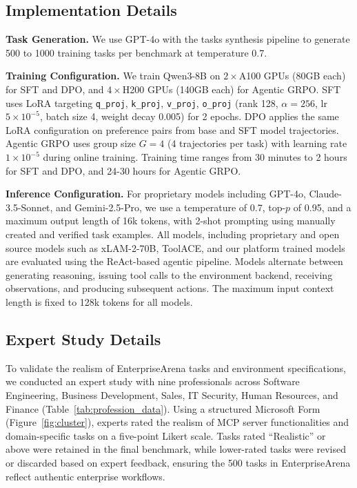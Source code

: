 \documentclass{article}
\theoremstyle{plain}
\theoremstyle{definition}
\theoremstyle{remark}
\begin{document}
\subsection{Implementation Details}
\label{app:implementation}
\vspace{-0.2cm}
\textbf{Task Generation.} We use GPT-4o with the tasks synthesis pipeline 
to generate 500 to 1000 training tasks per benchmark at temperature 0.7.

\noindent\textbf{Training Configuration.} 
We train Qwen3-8B on $2\times$A100 GPUs (80GB each) for SFT and DPO, and $4\times$H200 GPUs (140GB each) for Agentic GRPO. 
SFT uses LoRA targeting \texttt{q\_proj}, \texttt{k\_proj}, \texttt{v\_proj}, \texttt{o\_proj} (rank 128, $\alpha=256$, lr $5\times10^{-5}$, batch size 4, weight decay 0.005) for 2 epochs. 
DPO applies the same LoRA configuration on preference pairs from base and SFT model trajectories.
Agentic GRPO uses group size $G=4$ (4 trajectories per task) with learning rate $1\times10^{-5}$ during online training.
Training time ranges from 30 minutes to 2 hours for SFT and DPO, and 24-30 hours for 
Agentic GRPO.

\noindent\textbf{Inference Configuration.}
For proprietary models including GPT-4o, Claude-3.5-Sonnet, and Gemini-2.5-Pro, we use a temperature of 0.7, top-$p$ of 0.95, and a maximum output length of 16k tokens, with 2-shot prompting using manually created and verified task examples.
All models, including proprietary and open source models such as xLAM-2-70B, ToolACE, and our platform trained models are evaluated using the ReAct-based agentic pipeline. Models alternate between generating reasoning, issuing tool calls to the environment backend, receiving observations, and producing subsequent actions. The maximum input context length is fixed to 128k tokens for all models.


\subsection{Expert Study Details}
\label{app:exp_study}

To validate the realism of EnterpriseArena tasks and environment specifications, we conducted an expert study with nine professionals across Software Engineering, Business Development, Sales, IT Security, Human Resources, and Finance (Table~\ref{tab:profession_data}). Using a structured Microsoft Form (Figure~\ref{fig:cluster}), experts rated the realism of MCP server functionalities and domain-specific tasks on a five-point Likert scale. Tasks rated ``Realistic'' or above were retained in the final benchmark, while lower-rated tasks were revised or discarded based on expert feedback, ensuring the 500 tasks in EnterpriseArena reflect authentic enterprise workflows.
\end{document}
